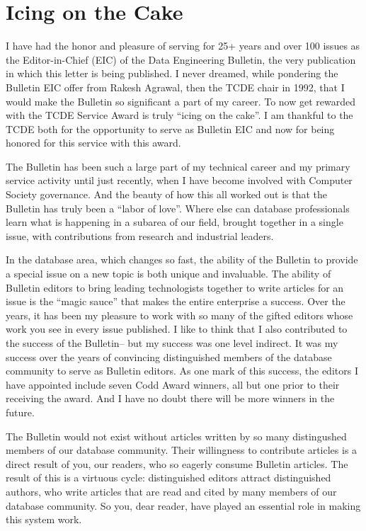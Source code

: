 \documentclass[11pt]{article}
\begin{document}
\section*{Icing on the Cake}

I have had the honor and pleasure of serving for 25+ years and over 100 issues as the Editor-in-Chief (EIC) of the Data Engineering Bulletin, the very publication in which this letter is being published.  I never dreamed, while pondering the Bulletin EIC offer from Rakesh Agrawal, then the TCDE chair in 1992, that I would make the Bulletin so significant a part of my career.  To now get rewarded with the TCDE Service Award is truly ``icing on the cake''.  I am thankful to the TCDE both for the opportunity to serve as Bulletin EIC and now for being honored for this service with this award.

The Bulletin has been such a large part of my technical career and my primary service activity until just recently, when I have become 
involved with Computer Society governance.  And the beauty of how this all worked out is that the Bulletin has truly been a ``labor of love''.  Where else can database professionals learn what is happening in a subarea of our field, brought together in a single issue, with contributions from research and industrial leaders.  

In the database area, which changes so fast, the ability of the Bulletin to provide a special issue on a new topic is both unique and invaluable.  The ability of Bulletin editors to bring leading technologists together to write articles for an issue is the ``magic sauce'' that makes the entire enterprise a success.  Over the years, it has been my pleasure to work with so many of the gifted editors whose work you see in every issue published.  I like to think that I also contributed to the success of the Bulletin-- but my success was one level indirect.  It was my success over the years of convincing distinguished members of the database community to serve as Bulletin editors.  As one mark of this success, the editors I have appointed include seven Codd Award winners, all but one prior to their receiving the award.  And I have no doubt there will be more winners in the future.

The Bulletin would not exist without articles written by so many distingushed members of our database community.  Their willingness to contribute articles is a direct result of you, our readers, who so eagerly consume Bulletin articles.  The result of this is a virtuous cycle: distinguished editors attract distinguished authors, who write articles that are read and cited by many members of our database community.  So you, dear reader, have played an essential role in making this system work. 
\end{document}
